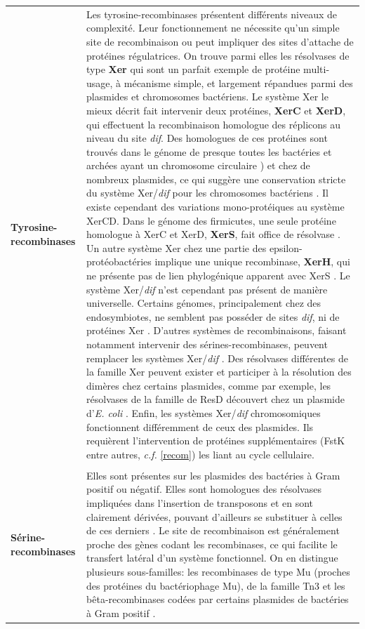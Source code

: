 \begin{longtable}{@{\hspace{-4cm}\hspace{1cm}} >{\bfseries}p{} | >{\small}p{}}
	Tyrosine-recombinases & Les tyrosine-recombinases présentent différents niveaux de complexité. Leur fonctionnement ne nécessite qu'un simple site de recombinaison ou peut impliquer des sites d'attache de protéines régulatrices. On trouve parmi elles les résolvases de type \textbf{Xer} qui sont un parfait exemple de protéine multi-usage, à mécanisme simple, et largement répandues parmi des plasmides et chromosomes bactériens. Le système Xer le mieux décrit fait intervenir deux protéines, \textbf{XerC} et \textbf{XerD}, qui effectuent la recombinaison homologue des réplicons au niveau du site \textit{dif}. Des homologues de ces protéines sont trouvés dans le génome de presque toutes les bactéries et archées ayant un chromosome circulaire \citep{hallet2004dna}\citep{cortez2010evidence}) et chez de nombreux plasmides, ce qui suggère une conservation stricte du système Xer/\textit{dif} pour les chromosomes bactériens \citep{Carnoy2009,Kono2011}. Il existe cependant des variations mono-protéiques au système XerCD. Dans le génome des firmicutes, une seule protéine homologue à XerC et XerD, \textbf{XerS}, fait office de résolvase \citep{Leroux2011}. Un autre système Xer chez une partie des epsilon-protéobactéries implique une unique recombinase, \textbf{XerH}, qui ne présente pas de lien phylogénique apparent avec XerS \citep{Carnoy2009}. Le système Xer/\textit{dif} n'est cependant pas présent de manière universelle. Certains génomes, principalement chez des endosymbiotes, ne semblent pas posséder de sites \textit{dif}, ni de protéines Xer \citep{Carnoy2009,Kono2011}. D'autres systèmes de recombinaisons, faisant notamment intervenir des sérines-recombinases, peuvent remplacer les systèmes Xer/\textit{dif} \citep{Carnoy2009}. Des résolvases différentes de la famille Xer peuvent exister et participer à la résolution des dimères chez certains plasmides, comme par exemple, les résolvases de la famille de ResD découvert chez un plasmide d'\textit{E. coli} \citep{hallet2004dna}. Enfin, les systèmes Xer/\textit{dif} chromosomiques fonctionnent différemment de ceux des plasmides. Ils requièrent l'intervention de protéines supplémentaires (FstK entre autres, \textit{c.f.} \ref{recom}) les liant au cycle cellulaire. \\
	\\[-0.2cm]
	Sérine-recombinases & Elles sont présentes sur les plasmides des bactéries à Gram positif ou négatif. Elles sont homologues des résolvases impliquées dans l'insertion de transposons et en sont clairement dérivées, pouvant d'ailleurs se substituer à celles de ces derniers \citep{hallet2004dna}. Le site de recombinaison est généralement proche des gènes codant les recombinases, ce qui facilite le transfert latéral d'un système fonctionnel. On en distingue plusieurs sous-familles: les recombinases de type Mu (proches des protéines du bactériophage Mu), de la famille Tn3 et les bêta-recombinases codées par certains plasmides de bactéries à Gram positif \citep{hallet2004dna}.
\end{longtable}
 
